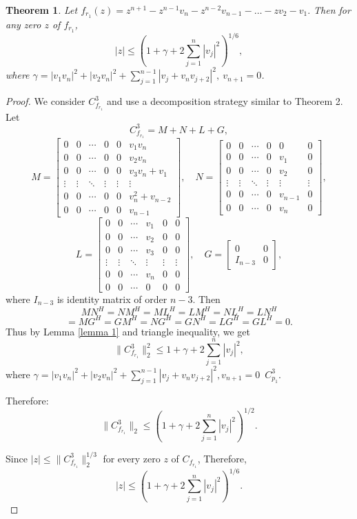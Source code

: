 \documentclass [12pt]{article}
\newtheorem{theorem}{Theorem}
\begin{document}
\begin{theorem}
Let $f_{r_{1}}(z)= z^{n+1}-z^{n-1}v_{n}-z^{n-2}v_{n-1}-\dots- zv_{2}-v_{1}.$ Then for any zero  $z$ of $f_{r_{1}}$,
\[|z| \leq \left(1 + \gamma + 2 \sum_{j=1}^{n} |v_j|^2 \right)^{1/6},\]
where $\gamma = |v_{1}v_{n}|^2 + |v_{2}v_{n}|^2 + \sum_{j=1}^{n-1} |v_j+v_{n}v_{j+2}|^{2}, ~ v_{n+1}=0 $.
\end{theorem}

\begin{proof}
We consider $C_{f_{r_1}}^3$ and use a decomposition strategy similar to Theorem 2. \\Let
\[
C_{f_{r_{1}}}^3 = M + N + L + G,
\]
\[M = 
\begin{bmatrix}
0 & 0 & \cdots & 0&0 & v_{1}v_{n} \\
0 & 0 & \cdots & 0&0& v_{2} v_{n}\\
0 & 0 & \cdots & 0 &0& v_{3}v_{n} +v_{1}\\
\vdots  &\vdots & \ddots &\vdots& \vdots & \vdots \\
0 & 0 & \cdots & 0 & 0&v^{2}_{n}+v_{n-2}\\
0 & 0 & \cdots & 0 & 0&v_{n-1}
\end{bmatrix},
\quad
N = 
\begin{bmatrix}
0 & 0 & \cdots & 0&0 & 0 \\
0 & 0 & \cdots & 0&v_{1}& 0 \\
0 & 0 & \cdots & 0 &v_{2}& 0 \\
\vdots  &\vdots & \ddots &\vdots& \vdots & \vdots \\
0 & 0 & \cdots & 0 & v_{n-1}&0\\
0 & 0 & \cdots & 0 & v_{n}&0
\end{bmatrix},
\]
\[
L= 
\begin{bmatrix}
0 & 0 & \cdots  &v_{1} & 0 &0\\
0 & 0 & \cdots  &v_{2}& 0&0 \\
0 & 0 & \cdots  &v_{3}& 0&0 \\
\vdots  &\vdots & \ddots &\vdots& \vdots & \vdots \\
0 & 0 & \cdots  & v_{n}&0&0\\
0 & 0 & \cdots  & 0&0&0
\end{bmatrix},
\quad G=\begin{bmatrix}
    0&0\\I_{n-3}&0
\end{bmatrix},\]
where $I_{n-3} $ is identity matrix of order $n-3.$
Then
\[
 MN^{H}=NM^{H}=ML^{H}= LM^{H} = NL^{H}=L N^{H}\]\[=MG^{H}=GM^{H}=NG^{H}=GN^{H} =LG^H=GL^{H}=0.
\]
Thus by Lemma \ref{lemma 1} and triangle inequality, we get
\[
\|C_{f_{r_1}}^3\|^2_{2} \leq 1 + \gamma + 2 \sum_{j=1}^{n} |v_j|^2,
\]
 where $\gamma = |v_{1}v_{n}|^2 + |v_{2}v_{n}|^2 + \sum_{j=1}^{n-1} |v_j+v_{n}v_{j+2}|^{2},  v_{n+1}=0 $\ $C_{p_1}^3$.

Therefore:
\[
\|C_{f_{r_{1}}}^3\|_{2} \leq \left(1 + \gamma + 2 \sum_{j=1}^{n} |v_j|^2 \right)^{1/2}.
\]

Since $|z| \leq \|C_{f_{{r}_1}}^3\|^{1/3}_{2}$ for every zero $z$ of $C_{f_{r_1}}$, Therefore,
\[
|z| \leq \left(1 + \gamma + 2 \sum_{j=1}^{n} |v_j|^2 \right)^{1/6}.\]
\end{proof}
\end{document}
